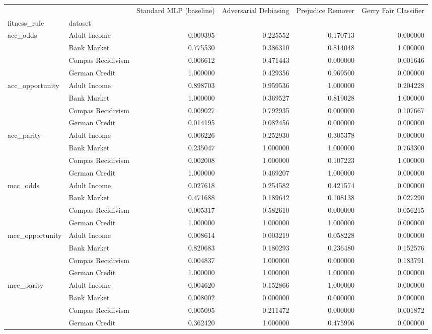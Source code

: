 \begin{tabular}{llrrrr}
\toprule
 &  & Standard MLP (baseline) & Adversarial Debiasing & Prejudice Remover & Gerry Fair Classifier \\
fitness_rule & dataset &  &  &  &  \\
\midrule
\multirow[t]{4}{*}{acc_odds} & Adult Income & 0.009395 & 0.225552 & 0.170713 & 0.000000 \\
 & Bank Market & 0.775530 & 0.386310 & 0.814048 & 1.000000 \\
 & Compas Recidivism & 0.006612 & 0.471443 & 0.000000 & 0.001646 \\
 & German Credit & 1.000000 & 0.429356 & 0.969500 & 0.000000 \\
\cline{1-6}
\multirow[t]{4}{*}{acc_opportunity} & Adult Income & 0.898703 & 0.959536 & 1.000000 & 0.204228 \\
 & Bank Market & 1.000000 & 0.369527 & 0.819028 & 1.000000 \\
 & Compas Recidivism & 0.009027 & 0.792935 & 0.000000 & 0.107667 \\
 & German Credit & 0.014195 & 0.082456 & 0.000000 & 0.000000 \\
\cline{1-6}
\multirow[t]{4}{*}{acc_parity} & Adult Income & 0.006226 & 0.252930 & 0.305378 & 0.000000 \\
 & Bank Market & 0.235047 & 1.000000 & 1.000000 & 0.763300 \\
 & Compas Recidivism & 0.002008 & 1.000000 & 0.107223 & 1.000000 \\
 & German Credit & 1.000000 & 0.469207 & 1.000000 & 0.000000 \\
\cline{1-6}
\multirow[t]{4}{*}{mcc_odds} & Adult Income & 0.027618 & 0.254582 & 0.421574 & 0.000000 \\
 & Bank Market & 0.471688 & 0.189642 & 0.108138 & 0.027290 \\
 & Compas Recidivism & 0.005317 & 0.582610 & 0.000000 & 0.056215 \\
 & German Credit & 1.000000 & 1.000000 & 1.000000 & 0.000000 \\
\cline{1-6}
\multirow[t]{4}{*}{mcc_opportunity} & Adult Income & 0.008614 & 0.003219 & 0.058228 & 0.000000 \\
 & Bank Market & 0.820683 & 0.180293 & 0.236480 & 0.152576 \\
 & Compas Recidivism & 0.004837 & 1.000000 & 0.000000 & 0.183791 \\
 & German Credit & 1.000000 & 1.000000 & 1.000000 & 0.000000 \\
\cline{1-6}
\multirow[t]{4}{*}{mcc_parity} & Adult Income & 0.004620 & 0.152866 & 1.000000 & 0.000000 \\
 & Bank Market & 0.008002 & 0.000000 & 0.000000 & 0.000000 \\
 & Compas Recidivism & 0.005095 & 0.211472 & 0.000000 & 0.001872 \\
 & German Credit & 0.362420 & 1.000000 & 0.475996 & 0.000000 \\
\cline{1-6}
\bottomrule
\end{tabular}
